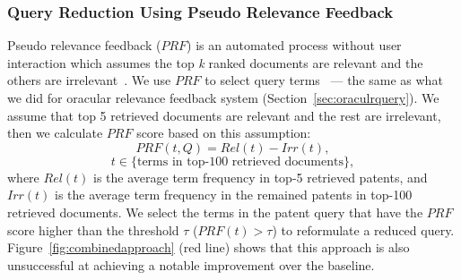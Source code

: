 \subsubsection{Query Reduction Using Pseudo Relevance Feedback}
Pseudo relevance feedback ($\mathit{PRF}$) is an automated process without user interaction which assumes the top \textit{k} ranked documents are relevant and the others are irrelevant~\citep{Baeza-Yates2011}. We use $\mathit{PRF}$ to select query terms~\cite{maxwell2013compact} --- the same as what we did for oracular relevance feedback system (Section~\ref{sec:oraculrquery}). We assume that top 5 retrieved documents are relevant and the rest are irrelevant, then we calculate $\mathit{PRF}$ score based on this assumption:  
\begin{equation}
PRF(t,Q)=Rel(t)-Irr(t), 
 \label{eq:score-prf}
\end{equation}
\vspace*{-2ex}
\begin{displaymath}t\in \lbrace \mbox{terms in top-100 retrieved documents}\rbrace,\end{displaymath}
where $\mathit{Rel(t)}$ is the average term frequency in top-5 retrieved patents, and $\mathit{Irr(t)}$ is
the average term frequency in the remained patents in top-100 retrieved documents.
We select the terms in the patent query that have the $\mathit{PRF}$ score higher than the threshold $\tau$ ($PRF(t)>\tau$) to reformulate a reduced query. Figure~\ref{fig:combinedapproach} (red line) shows that this approach is also unsuccessful at achieving a notable improvement over the baseline.

